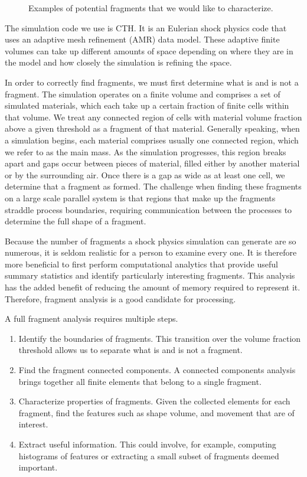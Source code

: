 \begin{figure}[htb]
  \centering
  \caption{Examples of potential fragments that we would like to
    characterize.}
  \label{fig:Fragments}
\end{figure}

The simulation code we use is CTH.  It is an Eulerian
shock physics code that uses an adaptive mesh refinement (AMR) data model.
These adaptive finite volumes can take up different amounts of space
depending on where they are in the model and how closely the simulation is
refining the space.

In order to correctly find fragments, we must first determine what is and
is not a fragment.  The simulation operates on a finite volume and
comprises a set of simulated materials, which each take up a certain
fraction of finite cells within that volume.  We treat any connected region
of cells with material volume fraction above a given threshold as a
fragment of that material.  Generally speaking, when a simulation begins,
each material comprises usually one connected region, which we refer to as
the main mass.  As the simulation progresses, this region breaks apart and
gaps occur between pieces of material, filled either by another material or
by the surrounding air.  Once there is a gap as wide as at least one cell,
we determine that a fragment as formed.  The challenge when finding these
fragments on a large scale parallel system is that regions that make up the
fragments straddle process boundaries, requiring communication between the
processes to determine the full shape of a fragment.

Because the number of fragments a shock physics simulation can generate are
so numerous, it is seldom realistic for a person to examine every one.  It
is therefore more beneficial to first perform computational analytics that
provide useful summary statistics and identify particularly interesting
fragments.  This analysis has the added benefit of reducing the amount of
memory required to represent it.  Therefore, fragment analysis is a good
candidate for \insitu processing.

A full fragment analysis requires multiple steps.
\begin{enumerate}
\item Identify the boundaries of fragments.  This transition over the
  volume fraction threshold allows us to separate what is and is not a
  fragment.
\item Find the fragment connected components.  A connected components
  analysis brings together all finite elements that belong to a single
  fragment.
\item Characterize properties of fragments.  Given the collected elements
  for each fragment, find the features such as shape volume, and movement
  that are of interest.
\item Extract useful information.  This could involve, for example,
  computing histograms of features or extracting a small subset of
  fragments deemed important.
\end{enumerate}

